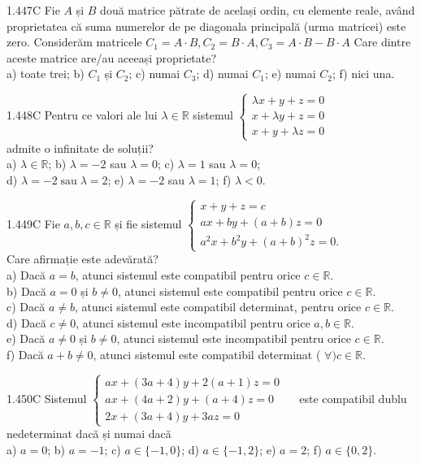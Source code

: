 \documentclass[11pt]{article}
\begin{document}
1.447C Fie $A$ și $B$ două matrice pătrate de același ordin, cu elemente reale, având proprietatea că suma numerelor de pe diagonala principală (urma matricei) este zero. Considerăm matricele $C_{1}=A \cdot B, C_{2}=B \cdot A, C_{3}=A \cdot B-B \cdot A$ Care dintre aceste matrice are/au aceeași proprietate?\\ a) toate trei; b) $C_{1}$ și $C_{2}$; c) numai $C_{3}$; d) numai $C_{1}$; e) numai $C_{2}$; f) nici una.

1.448C Pentru ce valori ale lui $\lambda \in \mathbb{R}$ sistemul $\left\{\begin{array}{l}\lambda x+y+z=0 \\ x+\lambda y+z=0 \\ x+y+\lambda z=0\end{array}\right.$\\admite o infinitate de soluții?\\ a) $\lambda \in \mathbb{R}$; b) $\lambda=-2$ sau $\lambda=0$; c) $\lambda=1$ sau $\lambda=0$;\\ d) $\lambda=-2 \operatorname{sau} \lambda=2$; e) $\lambda=-2$ sau $\lambda=1$; f) $\lambda<0$.

1.449C Fie $a, b, c \in \mathbb{R}$ și fie sistemul $\left\{\begin{array}{l}x+y+z=c \\ a x+b y+(a+b) z=0 \\ a^{2} x+b^{2} y+(a+b)^{2} z=0 .\end{array}\right.$\\Care afirmație este adevărată?\\ a) Dacă $a=b$, atunci sistemul este compatibil pentru orice $c \in \mathbb{R}$.\\ b) Dacă $a=0$ și $b \neq 0$, atunci sistemul este compatibil pentru orice $c \in \mathbb{R}$.\\ c) Dacă $a \neq b$, atunci sistemul este compatibil determinat, pentru orice $c \in \mathbb{R}$.\\ d) Dacă $c \neq 0$, atunci sistemul este incompatibil pentru orice $a, b \in \mathbb{R}$.\\ e) Dacă $a \neq 0$ și $b \neq 0$, atunci sistemul este incompatibil pentru orice $c \in \mathbb{R}$.\\ f) Dacă $a+b \neq 0$, atunci sistemul este compatibil determinat ( $\forall) c \in \mathbb{R}$.

1.450C Sistemul $\left\{\begin{array}{l}a x+(3 a+4) y+2(a+1) z=0 \\ a x+(4 a+2) y+(a+4) z=0 \\ 2 x+(3 a+4) y+3 a z=0\end{array} \quad\right.$ este compatibil dublu nedeterminat dacă și numai dacă\\ a) $a=0$; b) $a=-1$; c) $a \in\{-1,0\}$; d) $a \in\{-1,2\}$; e) $a=2$; f) $a \in\{0,2\}$.
\end{document}
